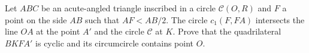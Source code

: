 Let $ABC$ be an acute-angled triangle inscribed in a circle $\mathcal C (O, R)$ and $F$ a point on the side $AB$ such that $AF < AB/2$. The circle $c_1(F, FA)$ intersects the line $OA$ at the point $A'$ and the circle $\mathcal C$ at $K$. Prove that the quadrilateral $BKFA'$ is cyclic and its circumcircle contains point $O$.